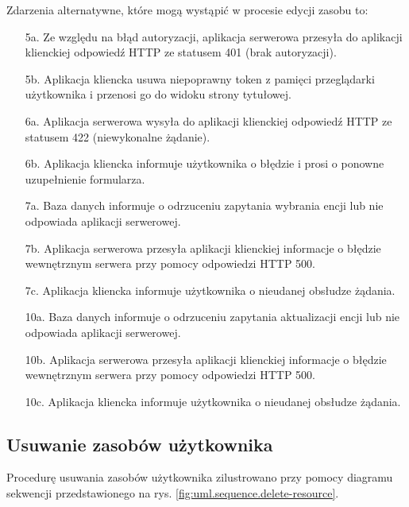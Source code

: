 Zdarzenia alternatywne, które mogą wystąpić w procesie edycji zasobu to:

\begin{enumerate}
    \item [5a.] Ze względu na błąd autoryzacji, aplikacja serwerowa przesyła do aplikacji klienckiej odpowiedź HTTP ze statusem 401 (brak autoryzacji).
    \item [5b.] Aplikacja kliencka usuwa niepoprawny token z pamięci przeglądarki użytkownika i przenosi go do widoku strony tytułowej.
    \item [6a.] Aplikacja serwerowa wysyła do aplikacji klienckiej odpowiedź HTTP ze statusem 422 (niewykonalne żądanie).
    \item [6b.] Aplikacja kliencka informuje użytkownika o błędzie i prosi o ponowne uzupełnienie formularza.
    \item [7a.] Baza danych informuje o odrzuceniu zapytania wybrania encji lub nie odpowiada aplikacji serwerowej. 
    \item [7b.] Aplikacja serwerowa przesyła aplikacji klienckiej informacje o błędzie wewnętrznym serwera przy pomocy odpowiedzi HTTP 500. 
    \item [7c.] Aplikacja kliencka informuje użytkownika o nieudanej obsłudze żądania.
    \item [10a.] Baza danych informuje o odrzuceniu zapytania aktualizacji encji lub nie odpowiada aplikacji serwerowej. 
    \item [10b.] Aplikacja serwerowa przesyła aplikacji klienckiej informacje o błędzie wewnętrznym serwera przy pomocy odpowiedzi HTTP 500. 
    \item [10c.] Aplikacja kliencka informuje użytkownika o nieudanej obsłudze żądania.
\end{enumerate}

\subsection{Usuwanie zasobów użytkownika}

Procedurę usuwania zasobów użytkownika zilustrowano przy pomocy diagramu sekwencji przedstawionego na rys. \ref{fig:uml.sequence.delete-resource}.

